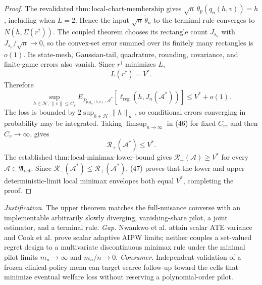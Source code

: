 \documentclass{article}
\begin{document}
\begin{proof}
The revalidated \(\mathrm{thm:local\text{-}chart\text{-}membership}\) gives \(\sqrt n\,\theta_p(q_n(h,v))=h\), including when \(L=2\). Hence the input \(\sqrt n\,\widetilde\theta_n\) to the terminal rule converges to \(N(h,\Sigma(r^\dagger))\). The coupled theorem chooses its rectangle count \(J_{s_n}\) with \(J_{s_n}/\sqrt n\to0\), so the convex-set error summed over its finitely many rectangles is \(o(1)\). Its state-mesh, Gaussian-tail, quadrature, rounding, covariance, and finite-game errors also vanish. Since \(r^\dagger\) minimizes \(L\),
\[
L(r^\dagger)=V^*.
\]
Therefore
\[
\sup_{h\in\mathcal H,\,\lVert v\rVert\le C_v}
E_{P_{p,q_n(h,v)},\mathcal A^*}
[\ell_{\mathrm{reg}}(h,J_n(\mathcal A^*))]
\le V^*+o(1).
\tag{46}
\]
The loss is bounded by \(2\sup_{h\in\mathcal H}\lVert h\rVert_\infty\), so conditional errors converging in probability may be integrated. Taking \(\limsup_{n\to\infty}\) in (46) for fixed \(C_v\), and then \(C_v\to\infty\), gives
\[
\mathcal R_+(\mathcal A^*)\le V^*.
\tag{47}
\]
The established \(\mathrm{thm:local\text{-}minimax\text{-}lower\text{-}bound}\) gives \(\mathcal R_-(\mathcal A)\ge V^*\) for every \(\mathcal A\in\mathfrak A_{\mathrm{det}}\). Since \(\mathcal R_-(\mathcal A^*)\le\mathcal R_+(\mathcal A^*)\), (47) proves that the lower and upper deterministic-limit local minimax envelopes both equal \(V^*\), completing the proof.
\end{proof}
\par\smallskip\noindent \textit{Justification.} The upper theorem matches the full-nuisance converse with an implementable arbitrarily slowly diverging, vanishing-share pilot, a joint estimator, and a terminal rule. \textit{Gap.} Nwankwo et al. attain scalar ATE variance and Cook et al. prove scalar adaptive AIPW limits; neither couples a set-valued regret design to a multivariate discontinuous minimax rule under the minimal pilot limits \(m_n\to\infty\) and \(m_n/n\to0\). \textit{Consumer.} Independent validation of a frozen clinical-policy menu can target scarce follow-up toward the cells that minimize eventual welfare loss without reserving a polynomial-order pilot.
\end{document}
